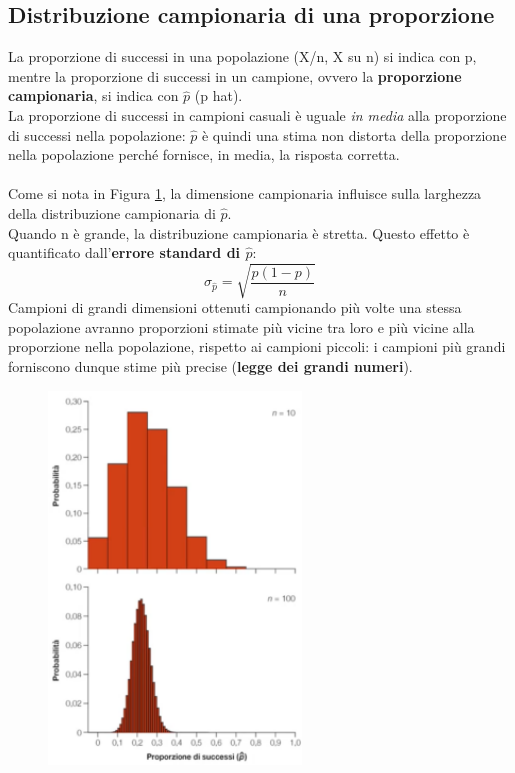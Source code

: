 \documentclass[10pt, draft]{book}
\begin{document}
\subsection{Distribuzione campionaria di una proporzione}
La proporzione di successi in una popolazione (X/n, X su n) si indica con p, mentre la proporzione di successi in un campione, ovvero la \textbf{proporzione campionaria}, si indica con $\hat{p}$ (p hat).
\\
La proporzione di successi in campioni casuali è uguale \textit{in media} alla proporzione di successi nella popolazione: $\hat{p}$ è quindi una stima non distorta della proporzione nella popolazione perché fornisce, in media, la risposta corretta.
\\
\\
Come si nota in Figura \ref*{fig7.1-2}, la dimensione campionaria influisce sulla larghezza della distribuzione campionaria di $\hat{p}$.\\
Quando n è grande, la distribuzione campionaria è stretta. Questo effetto è quantificato dall'\textbf{errore standard di $\hat{p}$}:
\begin{equation}
\sigma_{\hat{p}} = \sqrt{\frac{p(1-p)}{n}}
\end{equation}
\label{devstphat}
Campioni di grandi dimensioni ottenuti campionando più volte una stessa popolazione avranno proporzioni stimate più vicine tra loro e più vicine alla proporzione nella popolazione, rispetto ai campioni piccoli: i campioni più grandi forniscono dunque stime più precise (\textbf{legge dei grandi numeri}).
\clearpage
\begin{figure}[h]\label{fig7.1-2}
    \centering
    \includegraphics[width=0.6\textwidth]{fig7.1-2}
    \caption{\small{}}
\end{figure}
\end{document}
